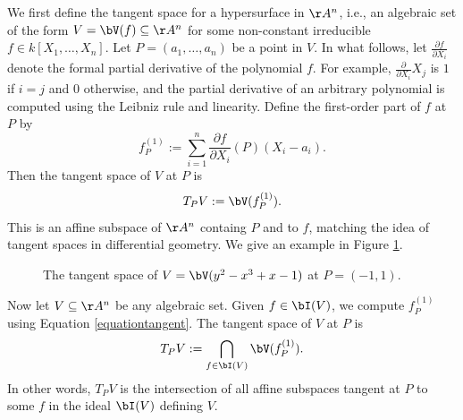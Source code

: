 \documentclass[12pt]{amsart}
\theoremstyle{plain}
\begin{document}
We first define the tangent space for a hypersurface in $\AA^n$, i.e., an algebraic set of the form $V=\bV(f)\subseteq \AA^n$ for some non-constant irreducible $f \in k[X_1,\ldots,X_n]$.
Let $P=(a_1,\ldots,a_n)$ be a point in $V$.
In what follows, let $\frac{\partial f}{\partial X_i}$ denote the formal partial derivative of the polynomial $f$.
For example, $\frac{\partial}{\partial X_i} X_j$ is $1$ if $i=j$ and $0$ otherwise, and the partial derivative of an arbitrary polynomial is computed using the Leibniz rule and linearity.
Define the first-order part of $f$ at $P$ by
\begin{equation}\label{equationtangent}
f_P^{(1)} := \sum_{i=1}^n \frac{\partial f}{\partial X_i} (P) (X_i-a_i).
\end{equation}
Then the tangent space of $V$ at $P$ is
$$T_PV := \bV(f_P^{(1)}).$$
This is an affine subspace of $\AA^n$ containg $P$ and to $f$, matching the idea of tangent spaces in differential geometry.
We give an example in Figure \ref{figure:tangentspace}.

\begin{figure}[h]
\centering
{}
\caption{The tangent space of $V = \bV(y^2 - x^3 + x - 1)$ at $P=(-1, 1)$.}
\label{figure:tangentspace}
\end{figure}

Now let $V\subseteq\AA^n$ be any algebraic set.
Given $f\in\bI(V)$, we compute $f_P^{(1)}$ using Equation \ref{equationtangent}.
The tangent space of $V$ at $P$ is
$$T_PV := \bigcap_{f\in\bI(V)} \bV(f_P^{(1)}).$$
In other words, $T_PV$ is the intersection of all affine subspaces tangent at $P$ to some $f$ in the ideal $\bI(V)$ defining $V$.
\end{document}
